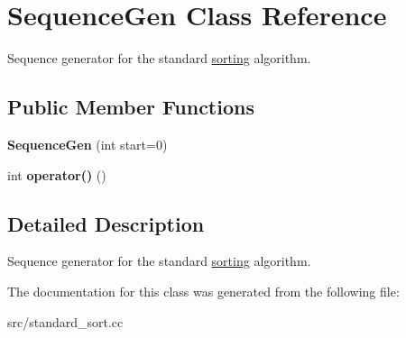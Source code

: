 \hypertarget{classSequenceGen}{
\section{SequenceGen Class Reference}
\label{d4/d99/classSequenceGen}
}


Sequence generator for the standard \hyperlink{classsorting}{sorting} algorithm.  
\subsection*{Public Member Functions}
\begin{DoxyCompactItemize}
\item 
\hypertarget{classSequenceGen_a4d1ef90f7ec766284371caf9e6c4f791}{
{\bfseries SequenceGen} (int start=0)}
\label{d4/d99/classSequenceGen_a4d1ef90f7ec766284371caf9e6c4f791}

\item 
\hypertarget{classSequenceGen_af63e6e7ae3a2fdcb86a6ed263f953c84}{
int {\bfseries operator()} ()}
\label{d4/d99/classSequenceGen_af63e6e7ae3a2fdcb86a6ed263f953c84}

\end{DoxyCompactItemize}


\subsection{Detailed Description}
Sequence generator for the standard \hyperlink{classsorting}{sorting} algorithm. 

The documentation for this class was generated from the following file:\begin{DoxyCompactItemize}
\item 
src/standard\_\-sort.cc\end{DoxyCompactItemize}
